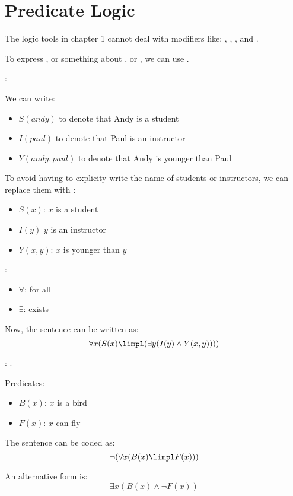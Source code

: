\chapter{Predicate Logic}

  \par The logic tools in chapter 1 cannot deal with modifiers like: , , , and .

  \par To express , or something about , or , we can use .

  : 

  \par We can write:
  \begin{itemize}
    \item $S(andy)$ to denote that Andy is a student
    \item $I(paul)$ to denote that Paul is an instructor
    \item $Y(andy, paul)$ to denote that Andy is younger than Paul
  \end{itemize}

  \par To avoid having to explicity write the name of students or instructors, we can replace them with :
  \begin{itemize}
    \item $S(x)$: $x$ is a student
    \item $I(y)$ $y$ is an instructor
    \item $Y(x, y)$: $x$ is younger than $y$
  \end{itemize}

    \par {}:
    \begin{itemize}
      \item $\forall$: for all
      \item $\exists$: exists
    \end{itemize}

    \par Now, the sentence can be written as:
      \[
        \forall x (S(x) \limpl (\exists y (I(y) \land Y(x, y))))
      \]

    : .
      \par Predicates:
      \begin{itemize}
        \item $B(x)$: $x$ is a bird
        \item $F(x)$: $x$ can fly
      \end{itemize}
      \par The sentence can be coded as:
        \[
          \lnot (\forall x(B(x) \limpl F(x)))
        \]
      \par An alternative form is:
        \[
          \exists x (B(x) \land \lnot F(x))
        \]

